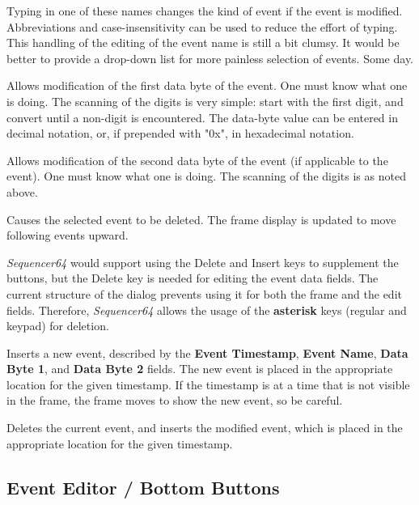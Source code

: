    Typing in one of these names changes the kind of event if the event is
   modified.  Abbreviations and case-insensitivity can be used to reduce the
   effort of typing.
   This handling of the editing of the event name is still a bit clumsy.
   It would be better to provide a drop-down list for more painless
   selection of events.  Some day.

   Allows modification of the first data byte of the event.
   One must know what one is doing.
   The scanning of the digits is very simple:  start with the first digit, and
   convert until a non-digit is encountered.  The data-byte value can be
   entered in decimal notation, or, if prepended with "0x", in hexadecimal
   notation.

   Allows modification of the second data byte of the event (if applicable
   to the event).
   One must know what one is doing.
   The scanning of the digits is as noted above.

   Causes the selected event to be deleted.
   The frame display is updated to move following events upward.

   \textsl{Sequencer64} would support using the Delete and Insert keys to
   supplement the buttons, but the Delete key is needed for editing the event
   data fields.
   The current structure of the dialog prevents using it for both
   the frame and the edit fields.  Therefore, \textsl{Sequencer64} allows the
   usage of the \textbf{asterisk} keys (regular and keypad) for
   deletion.

   Inserts a new event, described by the 
   \textbf{Event Timestamp},
   \textbf{Event Name},
   \textbf{Data Byte 1}, and
   \textbf{Data Byte 2} fields.
   The new event is placed in the appropriate location for the given timestamp.
   If the timestamp is at a time that is not visible in the frame, the frame
   moves to show the new event, so be careful.

   Deletes the current event, and inserts the modified event,
   which is placed in the appropriate location for the given
   timestamp.

\subsection{Event Editor / Bottom Buttons}
\label{subsec:seq64_event_editor_buttons}

